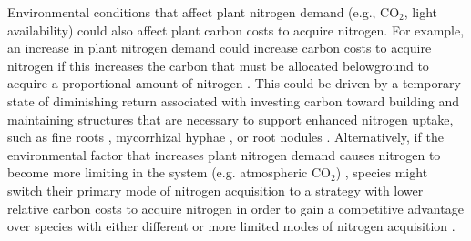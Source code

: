 Environmental conditions that affect plant nitrogen demand (e.g., CO$_2$, light availability) could also affect plant carbon costs to acquire nitrogen.  For example, an increase in plant nitrogen demand could increase carbon costs to acquire nitrogen if this increases the carbon that must be allocated belowground to acquire a proportional amount of nitrogen . This could be driven by a temporary state of diminishing return associated with investing carbon toward building and maintaining structures that are necessary to support enhanced nitrogen uptake, such as fine roots , mycorrhizal hyphae , or root nodules . Alternatively, if the environmental factor that increases plant nitrogen demand causes nitrogen to become more limiting in the system (e.g. atmospheric CO$_2$) , species might switch their primary mode of nitrogen acquisition to a strategy with lower relative carbon costs to acquire nitrogen in order to gain a competitive advantage over species with either different or more limited modes of nitrogen acquisition .

